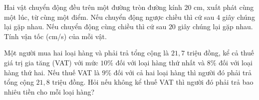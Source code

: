 \begin{exercises}
\begin{questions}[resume=SGK]
        \answerline
        \answerline
        \answerline

        \item Hai vật chuyển động đều trên một đường tròn đường kính $20$ cm, xuất phát cùng một lúc, từ cùng một điểm. Nếu chuyển động ngược chiều thì cứ sau $4$ giây chúng lại gặp nhau. Nếu chuyển động cùng chiều thì cứ sau $20$ giây chúng lại gặp nhau. Tính vận tốc (cm/s) của mỗi vật.

        \answerline
        \answerline
        \answerline

        \item Một người mua hai loại hàng và phải trả tổng cộng là $21{,}7$ triệu đồng, kể cả thuế giá trị gia tăng (VAT) với mức $10\%$ đối với loại hàng thứ nhất và $8\%$ đối với loại hàng thứ hai. Nếu thuế VAT là $9\%$ đối với cả hai loại hàng thì người đó phải trả tổng cộng $21{,}8$ triệu đồng. Hỏi nếu không kể thuế VAT thì người đó phải trả bao nhiêu tiền cho mỗi loại hàng?

        \answerline
        \answerline
        \answerline
    \end{questions}
\end{exercises}


